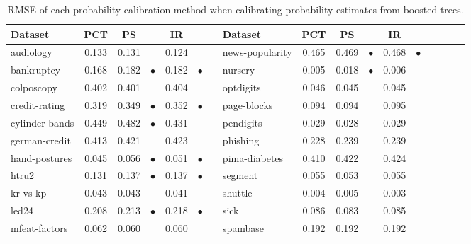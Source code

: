 \documentclass[wcp]{jmlr}
\begin{document}
\begin{table}[t]
\caption{\label{tab:boosted_trees}RMSE of each probability calibration method when calibrating probability estimates from boosted trees.}
\footnotesize
{\centering \begin{tabular}{lcc@{\hspace{0.1cm}}cc@{\hspace{0.1cm}}cclcc@{\hspace{0.1cm}}cc@{\hspace{0.1cm}}cc@{\hspace{0.1cm}}cr@{\hspace{0.1cm}}c}

\toprule
Dataset 			& PCT  & PS  &         & IR  & 			  & & Dataset 			& PCT  & PS  &         & IR  & 		 \\
\midrule
audiology       & 0.133 & 0.131 &           & 0.124 &           & & news-popularity & 0.465 & 0.469 & $\bullet$ & 0.468 & $\bullet$\\
bankruptcy      & 0.168 & 0.182 & $\bullet$ & 0.182 & $\bullet$ & & nursery         & 0.005 & 0.018 & $\bullet$ & 0.006 &          \\
colposcopy      & 0.402 & 0.401 &           & 0.404 &           & & optdigits       & 0.046 & 0.045 &           & 0.045 &          \\
credit-rating   & 0.319 & 0.349 & $\bullet$ & 0.352 & $\bullet$ & & page-blocks     & 0.094 & 0.094 &           & 0.095 &          \\
cylinder-bands  & 0.449 & 0.482 & $\bullet$ & 0.431 &           & & pendigits       & 0.029 & 0.028 &           & 0.029 &          \\
german-credit   & 0.413 & 0.421 &           & 0.423 &           & & phishing        & 0.228 & 0.239 &           & 0.239 &          \\
hand-postures   & 0.045 & 0.056 & $\bullet$ & 0.051 & $\bullet$ & & pima-diabetes   & 0.410 & 0.422 &           & 0.424 &          \\
htru2           & 0.131 & 0.137 & $\bullet$ & 0.137 & $\bullet$ & & segment         & 0.055 & 0.053 &           & 0.055 &          \\
kr-vs-kp        & 0.043 & 0.043 &           & 0.041 &           & & shuttle         & 0.004 & 0.005 &           & 0.003 &          \\
led24           & 0.208 & 0.213 & $\bullet$ & 0.218 & $\bullet$ & & sick            & 0.086 & 0.083 &           & 0.085 &          \\
mfeat-factors   & 0.062 & 0.060 &           & 0.060 &           & & spambase        & 0.192 & 0.192 &           & 0.192 &          \\

\end{tabular}}
\end{table}
\end{document}
